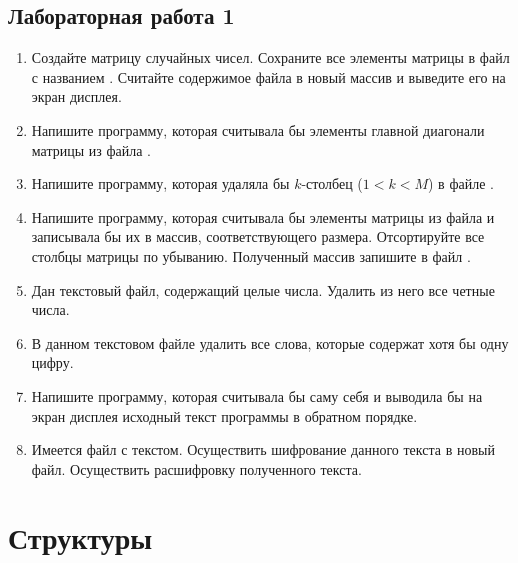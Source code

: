 \subsection{Лабораторная работа 1}
\begin{enumerate}[leftmargin=*]
    \item Создайте матрицу  случайных чисел. Сохраните все элементы матрицы в файл с названием . Считайте содержимое файла  в новый массив  и выведите его на экран дисплея.
    \item Напишите программу, которая считывала бы элементы главной диагонали матрицы из файла .
    \item Напишите программу, которая удаляла бы $k$-столбец ($1<k<M$) в файле .
    \item Напишите программу, которая считывала бы элементы матрицы из файла  и записывала бы их в массив, соответствующего размера. Отсортируйте все столбцы матрицы по убыванию. Полученный массив запишите в файл .
    \item Дан текстовый файл, содержащий целые числа. Удалить из него все четные числа. 
    \item В данном текстовом файле удалить все слова, которые содержат хотя бы одну цифру. 
    \item Напишите программу, которая считывала бы саму себя и выводила бы на экран дисплея исходный текст программы в обратном порядке.
    \item Имеется файл с текстом. Осуществить шифрование данного текста в новый файл. Осуществить расшифровку полученного текста.
\end{enumerate}

\section{Структуры}
